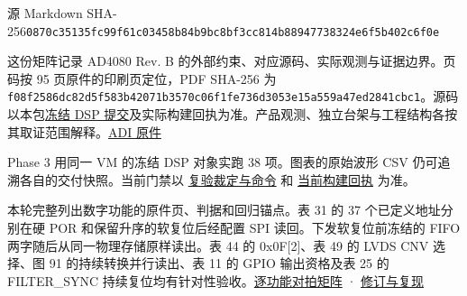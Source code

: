 \documentclass[UTF8,fontset=none,zihao=-4,a4paper]{ctexart}
\newcommand{\TraceDocumentTitle}[1]{%
  \par\noindent{\fontsize{24}{31}\selectfont\bfseries\color{TraceTitle}#1\par}%
  \vspace{3pt}\nopagebreak}
\newcommand{\TraceSection}[1]{%
  \par\addvspace{10pt}\noindent{\Large\bfseries\color{TraceTitle}#1\par}\nopagebreak[4]}
\newcommand{\TraceKeepHeading}{\par\penalty-120\relax}
\newcommand{\TraceCode}[1]{\texttt{\mdseries\upshape #1}}
\begin{document}
\color{TraceInk}
{\footnotesize\color{TraceMuted} 源 Markdown SHA-256\enspace\TraceCode{0870c35135fc\relax{}99f61c03458b\penalty150\relax{}84b9bc8bf3cc\penalty150\relax{}814b88947738\penalty150\relax{}324e6f5b402c\penalty150\relax{}6f0e}\par}
\hypertarget{trace-anchor-1}{}\TraceDocumentTitle{AD4080 数字外围逐模块手册审查}

这份矩阵记录 AD4080 Rev. B 的外部约束、\allowbreak{}对应源码、\allowbreak{}实际观测与证据边界。页码按 95 页原件的印刷页定位，PDF SHA-256 为 \TraceCode{f08f2586dc82\relax{}d5f583b42071\penalty150\relax{}b3570c06f1fe\penalty150\relax{}736d3053e15a\penalty150\relax{}559a47ed2841\penalty150\relax{}cbc1}。源码以本包\href{https://github.com/defineiocc02/20bit\_SAR\_ADC\_Behaviour\_Verification/blob/feat/ad4080-peripherals/subsys/ad4080\_peripherals/evidence/dsp-revision.txt}{冻结 DSP 提交}及实际构建回执为准。产品观测、\allowbreak{}独立台架与工程结构各按其取证范围解释。\href{https://www.analog.com/media/en/technical-documentation/data-sheets/ad4080.pdf}{ADI 原件}\par


\TraceKeepHeading{}\hypertarget{trace-anchor-2}{}\TraceSection{首要实测}

Phase 3 用同一 VM 的冻结 DSP 对象实跑 38 项。图表的原始波形 CSV 仍可追溯各自的交付快照。当前门禁以 \href{https://github.com/defineiocc02/20bit\_SAR\_ADC\_Behaviour\_Verification/blob/feat/ad4080-peripherals/docs/audit/RTL\_REFACTOR.md}{复验裁定与命令} 和 \href{https://github.com/defineiocc02/20bit\_SAR\_ADC\_Behaviour\_Verification/blob/feat/ad4080-peripherals/subsys/ad4080\_peripherals/evidence/peripheral-review.json}{当前构建回执} 为准。\par

本轮完整列出数字功能的原件页、\allowbreak{}判据和回归锚点。表 31 的 37 个已定义地址分别在硬 POR 和保留升序的软复位后经配置 SPI 读回。下发软复位前冻结的 FIFO 两字随后从同一物理存储原样读出。表 44 的 0x0F[2]、\allowbreak{}表 49 的 LVDS CNV 选择、\allowbreak{}图 91 的持续转换并行读出、\allowbreak{}表 11 的 GPIO 输出资格及表 25 的 FILTER\_\relax{}SYNC 持续复位均有针对性验收。\href{https://github.com/defineiocc02/20bit\_SAR\_ADC\_Behaviour\_Verification/blob/feat/ad4080-peripherals/subsys/ad4080\_peripherals/evidence/manual-functional-coverage.csv}{逐功能对拍矩阵} · \href{https://github.com/defineiocc02/20bit\_SAR\_ADC\_Behaviour\_Verification/blob/feat/ad4080-peripherals/subsys/ad4080\_peripherals/integration/product/ACCEPTANCE.md}{修订与复现}\par
\end{document}
